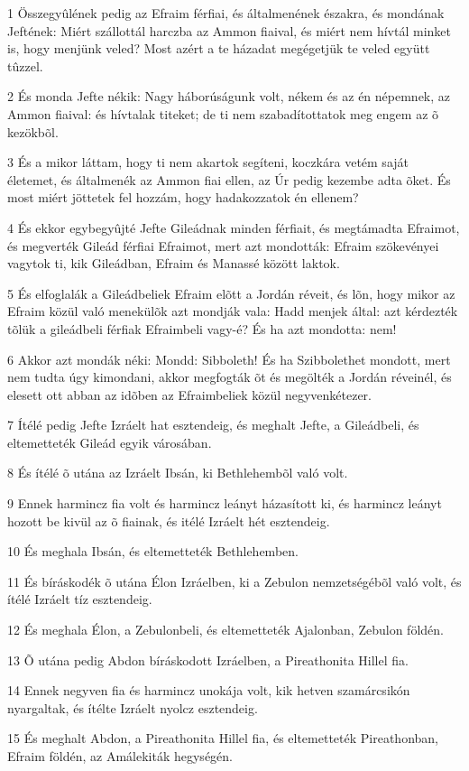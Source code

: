 \par 1 Összegyûlének pedig az Efraim férfiai, és általmenének északra, és mondának Jeftének: Miért szállottál harczba az Ammon fiaival, és miért nem hívtál minket is, hogy menjünk veled? Most azért a te házadat megégetjük te veled együtt tûzzel.
\par 2 És monda Jefte nékik: Nagy háborúságunk volt, nékem és az én népemnek, az Ammon fiaival: és hívtalak titeket; de ti nem szabadítottatok meg engem az õ kezökbõl.
\par 3 És a mikor láttam, hogy ti nem akartok segíteni, koczkára vetém saját életemet, és általmenék az Ammon fiai ellen, az Úr pedig kezembe adta õket. És most miért jöttetek fel hozzám, hogy hadakozzatok én ellenem?
\par 4 És ekkor egybegyûjté Jefte Gileádnak minden férfiait, és megtámadta Efraimot, és megverték Gileád férfiai Efraimot, mert azt mondották: Efraim szökevényei vagytok ti, kik Gileádban, Efraim és Manassé között laktok.
\par 5 És elfoglalák a Gileádbeliek Efraim elõtt a Jordán réveit, és lõn, hogy mikor az Efraim közül való menekülõk azt mondják vala: Hadd menjek által: azt kérdezték tõlük a gileádbeli férfiak Efraimbeli vagy-é? És ha azt mondotta: nem!
\par 6 Akkor azt mondák néki: Mondd: Sibboleth! És ha Szibbolethet mondott, mert nem tudta úgy kimondani, akkor megfogták õt és megölték a Jordán réveinél, és elesett ott abban az idõben az Efraimbeliek közül negyvenkétezer.
\par 7 Ítélé pedig Jefte Izráelt hat esztendeig, és meghalt Jefte, a Gileádbeli, és eltemetteték Gileád egyik városában.
\par 8 És ítélé õ utána az Izráelt Ibsán, ki Bethlehembõl való volt.
\par 9 Ennek harmincz fia volt és harmincz leányt házasított ki, és harmincz leányt hozott be kivül az õ fiainak, és itélé Izráelt hét esztendeig.
\par 10 És meghala Ibsán, és eltemetteték Bethlehemben.
\par 11 És bíráskodék õ utána Élon Izráelben, ki a Zebulon nemzetségébõl való volt, és ítélé Izráelt tíz esztendeig.
\par 12 És meghala Élon, a Zebulonbeli, és eltemetteték Ajalonban, Zebulon földén.
\par 13 Õ utána pedig Abdon bíráskodott Izráelben, a Pireathonita Hillel fia.
\par 14 Ennek negyven fia és harmincz unokája volt, kik hetven szamárcsikón nyargaltak, és ítélte Izráelt nyolcz esztendeig.
\par 15 És meghalt Abdon, a Pireathonita Hillel fia, és eltemetteték Pireathonban, Efraim földén, az Amálekiták hegységén.

